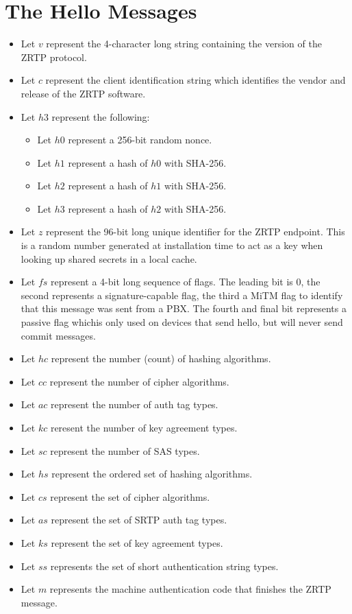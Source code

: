 \documentclass[11pt]{article}
\begin{document}
  \section{The Hello Messages}
  \begin{itemize}
    \item Let $v$ represent the 4-character long string containing 
          the version of the ZRTP protocol.
    \item Let $c$ represent the client identification string which
          identifies the vendor and release of the ZRTP software.
    \item Let $h3$ represent the following:
       \begin{itemize}
       \item Let $h0$ represent a 256-bit random nonce.
       \item Let $h1$ represent a hash of $h0$ with SHA-256.
       \item Let $h2$ represent a hash of $h1$ with SHA-256.
       \item Let $h3$ represent a hash of $h2$ with SHA-256.
       \end{itemize}
    \item Let $z$ represent the 96-bit long unique identifier for 
          the ZRTP endpoint. This is a random number generated at 
          installation time to act as a key when looking up 
          shared secrets in a local cache.
    \item Let $fs$ represent a 4-bit long sequence of flags. 
          The leading bit is 0, the second represents a 
          signature-capable flag, the third a MiTM flag to 
          identify that this message was sent from a PBX. The 
          fourth and final bit represents a passive flag 
          whichis only used on devices that send hello, 
          but will never send commit messages.
    \item Let $hc$ represent the number (count) of hashing 
            algorithms.
    \item Let $cc$ represent the number of cipher algorithms.
    \item Let $ac$ represent the number of auth tag types.
    \item Let $kc$ reresent the number of key agreement types.
    \item Let $sc$ represent the number of SAS types.
    \item Let $hs$ represent the ordered set of hashing algorithms.
    \item Let $cs$ represent the set of cipher algorithms.
    \item Let $as$ represent the set of SRTP auth tag types.
    \item Let $ks$ represent the set of key agreement types.
    \item Let $ss$ represents the set of short authentication 
          string types.
    \item Let $m$ represents the machine authentication code 
          that finishes the ZRTP message.
  \end{itemize}
\end{document}
